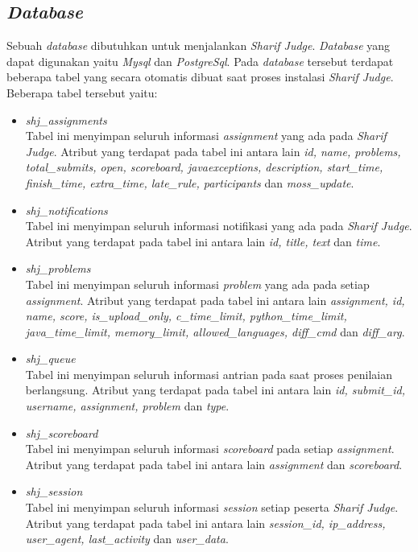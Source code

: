\subsection{\textit{Database}}
Sebuah \textit{database} dibutuhkan untuk menjalankan \textit{Sharif Judge}. \textit{Database} yang dapat digunakan yaitu \textit{Mysql} dan \textit{PostgreSql}. Pada \textit{database} tersebut terdapat beberapa tabel yang secara otomatis dibuat saat proses instalasi \textit{Sharif Judge}. Beberapa tabel tersebut yaitu:
\begin{itemize}
	\item \textit{shj\_assignments} \\
	Tabel ini menyimpan seluruh informasi \textit{assignment} yang ada pada \textit{Sharif Judge}. Atribut yang terdapat pada tabel ini antara lain \textit{id, name, problems, total\_submits, open, scoreboard, javaexceptions, description, start\_time, finish\_time, extra\_time, late\_rule, participants} dan \textit{moss\_update}.
	\item \textit{shj\_notifications} \\
	Tabel ini menyimpan seluruh informasi notifikasi yang ada pada \textit{Sharif Judge}. Atribut yang terdapat pada tabel ini antara lain \textit{id, title, text} dan \textit{time}.
	\item \textit{shj\_problems} \\
	Tabel ini menyimpan seluruh informasi \textit{problem} yang ada pada setiap \textit{assignment}. Atribut yang terdapat pada tabel ini antara lain \textit{assignment, id, name, score, is\_upload\_only, c\_time\_limit, python\_time\_limit, java\_time\_limit, memory\_limit, allowed\_languages, diff\_cmd} dan \textit{diff\_arg}. 
	\item \textit{shj\_queue} \\
	Tabel ini menyimpan seluruh informasi antrian pada saat proses penilaian berlangsung. Atribut yang terdapat pada tabel ini antara lain \textit{id, submit\_id, username, assignment, problem} dan \textit{type}.
	\item \textit{shj\_scoreboard} \\
	Tabel ini menyimpan seluruh informasi \textit{scoreboard} pada setiap \textit{assignment}. Atribut yang terdapat pada tabel ini antara lain \textit{assignment} dan \textit{scoreboard}.
	\item \textit{shj\_session} \\
	Tabel ini menyimpan seluruh informasi \textit{session} setiap peserta \textit{Sharif Judge}. Atribut yang terdapat pada tabel ini antara lain \textit{session\_id, ip\_address, user\_agent, last\_activity} dan \textit{user\_data}.

\end{itemize}
